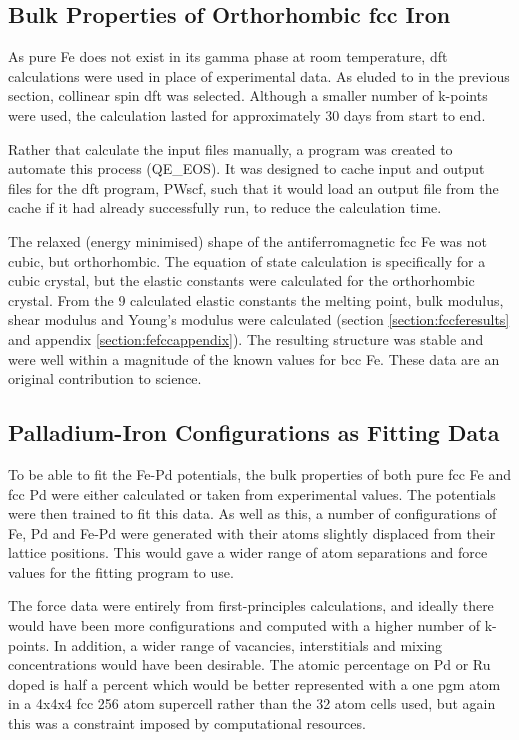 \subsection{Bulk Properties of Orthorhombic \acrshort{fcc} Iron}

As pure Fe does not exist in its gamma phase at room temperature, \acrshort{dft} calculations were used in place of experimental data.  As eluded to in the previous section, collinear spin \acrshort{dft} was selected.  Although a smaller number of k-points were used, the calculation lasted for approximately 30 days from start to end.

Rather that calculate the input files manually, a program was created to automate this process (QE\_EOS).  It was designed to cache input and output files for the \acrshort{dft} program, PWscf, such that it would load an output file from the cache if it had already successfully run, to reduce the calculation time.

The relaxed (energy minimised) shape of the antiferromagnetic \acrshort{fcc} Fe was not cubic, but orthorhombic.  The equation of state calculation is specifically for a cubic crystal, but the elastic constants were calculated for the orthorhombic crystal.  From the 9 calculated elastic constants the melting point, bulk modulus, shear modulus and Young's modulus were calculated (section \ref{section:fccferesults} and appendix \ref{section:fefccappendix}).  The resulting structure was stable and were well within a magnitude of the known values for \acrshort{bcc} Fe.  These data are an original contribution to science.



\subsection{Palladium-Iron Configurations as Fitting Data}

To be able to fit the Fe-Pd potentials, the bulk properties of both pure \acrshort{fcc} Fe and \acrshort{fcc} Pd were either calculated or taken from experimental values.  The potentials were then trained to fit this data.  As well as this, a number of configurations of Fe, Pd and Fe-Pd were generated with their atoms slightly displaced from their lattice positions.  This would gave a wider range of atom separations and force values for the fitting program to use.

The force data were entirely from first-principles calculations, and ideally there would have been more configurations and computed with a higher number of k-points.  In addition, a wider range of vacancies, interstitials and mixing concentrations would have been desirable. The atomic percentage on Pd or Ru doped is half a percent which would be better represented with a one \acrshort{pgm} atom in a 4x4x4 \acrshort{fcc} 256 atom supercell rather than the 32 atom cells used, but again this was a constraint imposed by computational resources.



